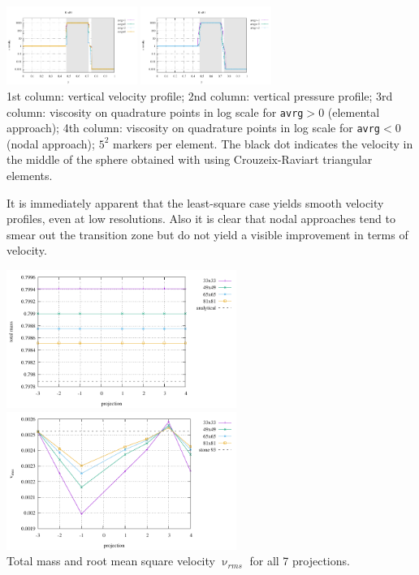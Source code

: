 \begin{center}
\includegraphics[width=4.25cm]{python_codes/fieldstone_41/results/exp3/81x81/profile_eta_elemental.pdf}
\includegraphics[width=4.25cm]{python_codes/fieldstone_41/results/exp3/81x81/profile_eta_nodal.pdf}\\
{\captionfont 
1st column: vertical velocity profile; 
2nd column: vertical pressure profile; 
3rd column: viscosity on quadrature points in log scale for {\tt avrg}$>0$ (elemental approach);
4th column: viscosity on quadrature points in log scale for {\tt avrg}$<0$ (nodal approach);
$5^2$ markers per element.
The black dot indicates the velocity in the middle of the sphere 
obtained with  using Crouzeix-Raviart triangular elements.} 
\end{center}
It is immediately apparent that the least-square case yields smooth velocity profiles, even at 
low resolutions. Also it is clear that nodal approaches tend to smear out the transition zone
but do not yield a visible improvement in terms of velocity.

\begin{center}
\includegraphics[width=7.5cm]{python_codes/fieldstone_41/results/exp3/mass.pdf}
\includegraphics[width=7.5cm]{python_codes/fieldstone_41/results/exp3/vrms.pdf}\\
{\captionfont Total mass and root mean square velocity $\upnu_{rms}$ for all 7 projections.}
\end{center}

